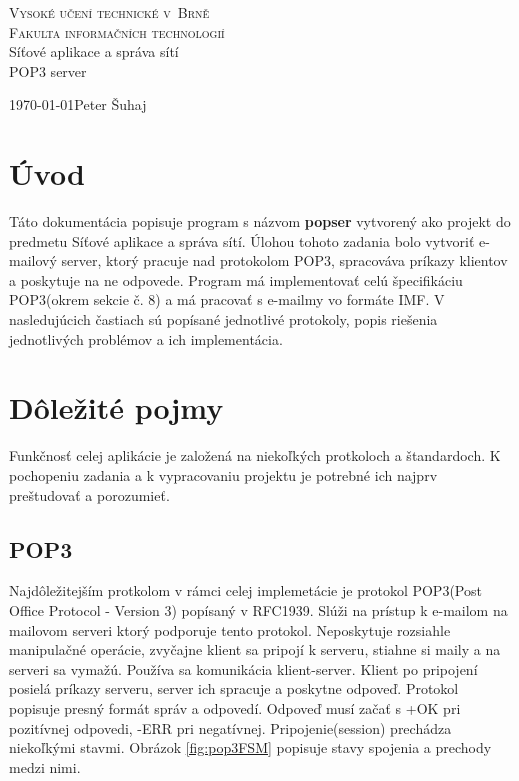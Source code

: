 \documentclass[11pt,a4paper]{article}
\begin{document}
\begin{titlepage}
\begin{center}
	\thispagestyle{empty}
	\textsc{\Huge Vysoké učení technické v~Brně\\[0.4em]
			\huge Fakulta informačních technologií}\\
	{\LARGE 
	Síťové aplikace a správa sítí\\[0.4em]
	\Huge 
	POP3 server}
\end{center}
{\LARGE \today \hfill Peter Šuhaj}
\end{titlepage}	

\setlength{\parskip}{0pt}

{\hypersetup{hidelinks}\tableofcontents}

\setlength{\parskip}{0pt}

\newpage

\section{Úvod}
Táto dokumentácia popisuje program s názvom \textbf{popser} vytvorený ako projekt do predmetu Síťové aplikace a správa sítí. Úlohou tohoto zadania bolo vytvoriť e-mailový server, ktorý pracuje nad protokolom POP3, spracováva príkazy klientov a poskytuje na ne odpovede. Program má implementovať celú špecifikáciu POP3(okrem sekcie č. 8) a má pracovať s e-mailmy vo formáte IMF. V nasledujúcich častiach sú popísané jednotlivé protokoly, popis riešenia jednotlivých problémov a ich implementácia. 


\section{Dôležité pojmy}
Funkčnosť celej aplikácie je založená na niekoľkých protkoloch a štandardoch. K pochopeniu zadania a k vypracovaniu projektu je potrebné ich najprv preštudovať a porozumieť. 


\subsection{POP3}
Najdôležitejším protkolom v rámci celej implemetácie je protokol POP3(Post Office Protocol - Version 3) popísaný v RFC1939\cite{pop3}. Slúži na prístup k e-mailom na mailovom serveri ktorý podporuje tento protokol. Neposkytuje rozsiahle manipulačné operácie, zvyčajne klient sa pripojí k serveru, stiahne si maily a na serveri sa vymažú. Používa sa komunikácia klient-server. Klient po pripojení posielá príkazy serveru, server ich spracuje a poskytne odpoveď. Protokol popisuje presný formát správ a odpovedí. Odpoveď musí začať s +OK pri pozitívnej odpovedi, -ERR pri negatívnej. Pripojenie(session) prechádza niekoľkými stavmi. Obrázok \ref{fig:pop3FSM} popisuje stavy spojenia a prechody medzi nimi.
\end{document}
